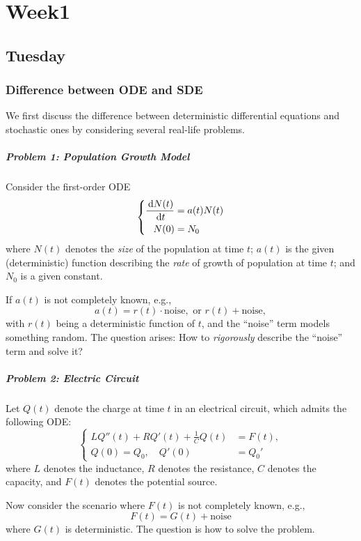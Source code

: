 
\chapter{Week1}

\section{Tuesday}
\subsection{Difference between ODE and SDE}
We first discuss the difference between deterministic differential equations and stochastic ones by considering several real-life problems.
\paragraph{Problem 1: Population Growth Model}
Consider the first-order ODE
\[
\left\{
\begin{aligned}
\frac{\,\mathrm{d} N(t)}{\,\mathrm{d} t} &= a(t)N(t)\\
N(0)&=N_0
\end{aligned}
\right.
\]
where $N(t)$ denotes the \emph{size} of the population at time $t$; $a(t)$ is the given (deterministic) function describing the \emph{rate} of growth of population at time $t$;
and $N_0$ is a given constant.

If $a(t)$ is not completely known, e.g.,
\[
a(t) = r(t)\cdot\mbox{noise},
\mbox{ or }
r(t)+\mbox{noise},
\]
with $r(t)$ being a deterministic function of $t$, and the ``noise'' term models something random.
The question arises: How to \textit{rigorously} describe the ``noise'' term and solve it?

\paragraph{Problem 2: Electric Circuit}
Let $Q(t)$ denote the charge at time $t$ in an electrical circuit, which admits the following ODE:
\[
\left\{
\begin{aligned}
LQ''(t)+RQ'(t)+\frac{1}{C}Q(t)&=F(t),\\
Q(0)=Q_0,\quad Q'(0)&=Q_0'
\end{aligned}
\right.
\]
where $L$ denotes the inductance, $R$ denotes the resistance, $C$ denotes the {capacity}, and 
$F(t)$ denotes the potential source.

Now consider the scenario where $F(t)$ is not completely known, e.g.,
\[
F(t)=G(t)+\mbox{noise}
\]
where $G(t)$ is deterministic. 
The question is how to solve the problem.

